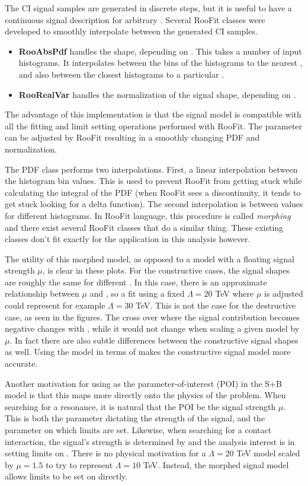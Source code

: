 The CI signal samples are generated in discrete steps, but it is useful to have a continuous signal description for arbitrary \lam.
Several RooFit classes were developed to smoothly interpolate between the generated CI samples.
\begin{itemize}
    \item \textbf{RooAbsPdf} handles the shape, depending on \lam. This takes a number of input histograms. It interpolates between the bins of the histograms to the nearest \mll, and also between the closest histograms to a particular \lam.
    \item \textbf{RooRealVar} handles the normalization of the signal shape, depending on \lam.
\end{itemize}
The advantage of this implementation is that the signal model is compatible with all the fitting and limit setting operations performed with RooFit.
The \lam parameter can be adjusted by RooFit resulting in a smoothly changing PDF and normalization.

The PDF class performs two interpolations.
First, a linear interpolation between the histogram bin values.
This is used to prevent RooFit from getting stuck while calculating the integral of the PDF (when RooFit sees a discontinuity, it tends to get stuck looking for a delta function).
The second interpolation is between \lam values for different histograms.
In RooFit language, this procedure is called \emph{morphing} and there exist several RooFit classes that do a similar thing.
These existing classes don't fit exactly for the application in this analysis however.

The utility of this morphed model, as opposed to a model with a floating signal strength $\mu$, is clear in these plots.
For the constructive cases, the signal shapes are roughly the same for different \lam.
In this case, there is an approximate relationship between $\mu$ and \lam, so a fit using a fixed $\Lambda=20$ TeV where $\mu$ is adjusted could represent for example $\Lambda=30$ TeV.
This is not the case for the destructive case, as seen in the figures.
The cross over where the signal contribution becomes negative changes with \lam, while it would not change when scaling a given model by $\mu$.
In fact there are also subtle differences between the constructive signal shapes as well.
Using the model in terms of \lam makes the constructive signal model more accurate.

Another motivation for using \lam as the parameter-of-interest (POI) in the S+B model is that this maps more directly onto the physics of the problem.
When searching for a resonance, it is natural that the POI be the signal strength $\mu$.
This is both the parameter dictating the strength of the signal, and the  parameter on which limits are set.
Likewise, when searching for a contact interaction, the signal's strength is determined by \lam and the analysis interest is in setting limits on \lam.
There is no physical motivation for a $\Lambda=20$ TeV model scaled by $\mu=1.
5$ to try to represent $\Lambda=10$ TeV. Instead, the morphed signal model allows limits to be set on \lam directly.

